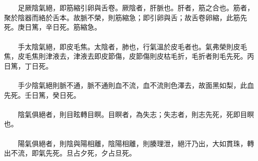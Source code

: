 \\\\
　　足厥陰氣絕，即筋縮引卵與舌卷。厥陰者，肝脈也。肝者，筋之合也。筋者，聚於陰器而絡於舌本。故脈不榮，則筋縮急；即引卵與舌；故舌卷卵縮，此筋先死。庚日篤，辛日死。筋縮急。
\\\\
　　手太陰氣絕，即皮毛焦。太陰者，肺也，行氣溫於皮毛者也。氣弗榮則皮毛焦，皮毛焦則津液去，津液去即皮節傷，皮節傷則皮枯毛折，毛折者則毛先死。丙日篤，丁日死。
\\\\
　　手少陰氣絕則脈不通，脈不通則血不流，血不流則色澤去，故面黑如梨，此血先死。壬日篤，癸日死。
\\\\
　　陰氣俱絕者，則目眩轉目瞑。目瞑者，為失志；失志者，則志先死，死即目瞑也。
\\\\
　　陽氣俱絕者，則陰與陽相離，陰陽相離，則腠理泄，絕汗乃出，大如貫珠，轉出不流，即氣先死。旦占夕死，夕占旦死。



